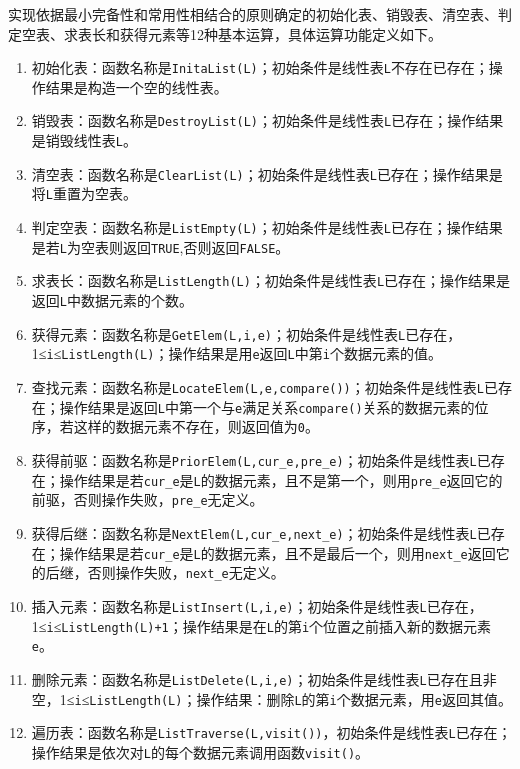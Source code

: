 \documentclass[supercite]{Experimental_Report}
\theoremstyle{definition}
\begin{document}
实现依据最小完备性和常用性相结合的原则确定的初始化表、销毁表、清空表、判定空表、求表长和获得元素等12种基本运算，具体运算功能定义如下。
\begin{enumerate}


	\item 初始化表：函数名称是\verb|InitaList(L)|；初始条件是线性表\verb|L|不存在已存在；操作结果是构造一个空的线性表。


	\item 销毁表：函数名称是\verb|DestroyList(L)|；初始条件是线性表\verb|L|已存在；操作结果是销毁线性表\verb|L|。


	\item 清空表：函数名称是\verb|ClearList(L)|；初始条件是线性表\verb|L|已存在；操作结果是将\verb|L|重置为空表。


	\item 判定空表：函数名称是\verb|ListEmpty(L)|；初始条件是线性表\verb|L|已存在；操作结果是若\verb|L|为空表则返回\verb|TRUE|,否则返回\verb|FALSE|。


	\item 求表长：函数名称是\verb|ListLength(L)|；初始条件是线性表\verb|L|已存在；操作结果是返回\verb|L|中数据元素的个数。


	\item 获得元素：函数名称是\verb|GetElem(L,i,e)|；初始条件是线性表\verb|L|已存在， \\ 1≤\verb|i|≤\verb|ListLength(L)|；操作结果是用\verb|e|返回\verb|L|中第\verb|i|个数据元素的值。


	\item 查找元素：函数名称是\verb|LocateElem(L,e,compare())|；初始条件是线性表\verb|L|已存在；操作结果是返回\verb|L|中第一个与\verb|e|满足关系\verb|compare()|关系的数据元素的位序，若这样的数据元素不存在，则返回值为\verb|0|。


	\item 获得前驱：函数名称是\verb|PriorElem(L,cur_e,pre_e)|；初始条件是线性表\verb|L|已存在；操作结果是若\verb|cur_e|是\verb|L|的数据元素，且不是第一个，则用\verb|pre_e|返回它的前驱，否则操作失败，\verb|pre_e|无定义。


	\item 获得后继：函数名称是\verb|NextElem(L,cur_e,next_e)|；初始条件是线性表\verb|L|已存在；操作结果是若\verb|cur_e|是\verb|L|的数据元素，且不是最后一个，则用\verb|next_e|返回它的后继，否则操作失败，\verb|next_e|无定义。


	\item 插入元素：函数名称是\verb|ListInsert(L,i,e)|；初始条件是线性表\verb|L|已存在，\\ 1≤\verb|i|≤\verb|ListLength(L)+1|；操作结果是在\verb|L|的第\verb|i|个位置之前插入新的数据元素\verb|e|。


	\item 删除元素：函数名称是\verb|ListDelete(L,i,e)|；初始条件是线性表\verb|L|已存在且非空，1≤\verb|i|≤\verb|ListLength(L)|；操作结果：删除\verb|L|的第\verb|i|个数据元素，用\verb|e|返回其值。


	\item 遍历表：函数名称是\verb|ListTraverse(L,visit())|，初始条件是线性表\verb|L|已存在；操作结果是依次对\verb|L|的每个数据元素调用函数\verb|visit()|。
\end{enumerate}
\end{document}

